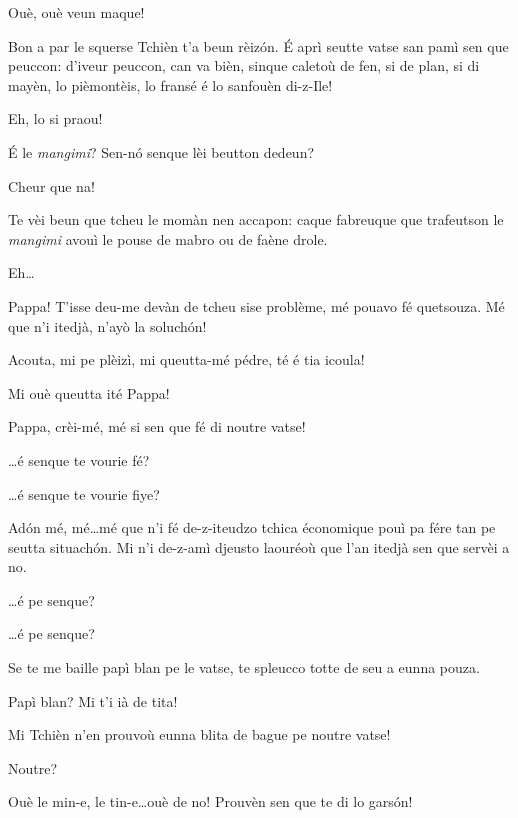\begin{drama}
\Mariettospeaks Ouè, ouè veun maque!


\Mariettospeaks Bon a par le squerse Tchièn t’a beun rèiz\'on. \'E aprì seutte vatse san pamì sen que peuccon: d’iveur peuccon, can va bièn, sinque caletoù de fen, si de plan, si di mayèn, lo pièmontèis, lo fransé é lo sanfouèn di-z-Ile!


\Cienspeaks {} Eh, lo si praou!

\Mariettospeaks \'E le \textit{mangimi}? Sen-n\'o senque lèi beutton dedeun?

\Cienspeaks Cheur que na!

\Mariettospeaks Te vèi beun que tcheu le momàn nen accapon: caque fabreuque que trafeutson le \textit{mangimi} avouì le pouse de mabro ou de faène drole.

\Cienspeaks {} Eh\ldots 

\Simonspeaks {} Pappa!  T’isse deu-me devàn de tcheu sise problème, mé pouavo fé quetsouza. Mé que n'i itedjà, n'ayò la soluch\'on!

\Cienspeaks Acouta, mi pe plèizì, mi queutta-mé pédre, té é tia icoula!

\Mariettospeaks Mi ouè queutta ité Pappa!

\Simonspeaks Pappa, crèi-mé, mé si sen que fé di noutre vatse! 

\Cienspeaks \ldots é senque te vourie fé?

\Mariettospeaks \ldots é senque te vourie fiye?

\Simonspeaks Ad\'on mé, mé\ldots mé que n'i fé de-z-iteudzo tchica économique pouì pa fére tan pe seutta situach\'on. Mi n’i de-z-amì djeusto laouréoù que l’an itedjà sen que servèi a no.

\Cienspeaks \ldots é pe senque?

\Mariettospeaks \ldots é pe senque?

\Simonspeaks Se te me baille papì blan pe le vatse, te spleucco totte de seu a eunna pouza.

\Cienspeaks Papì blan? Mi t'i ià de tita!

\Mariettospeaks Mi Tchièn n’en prouvoù eunna blita de bague pe noutre vatse! 

\Cienspeaks Noutre?

\Mariettospeaks  Ouè le min-e, le tin-e\ldots ouè de no! Prouvèn sen que te di lo gars\'on!


\end{drama}
